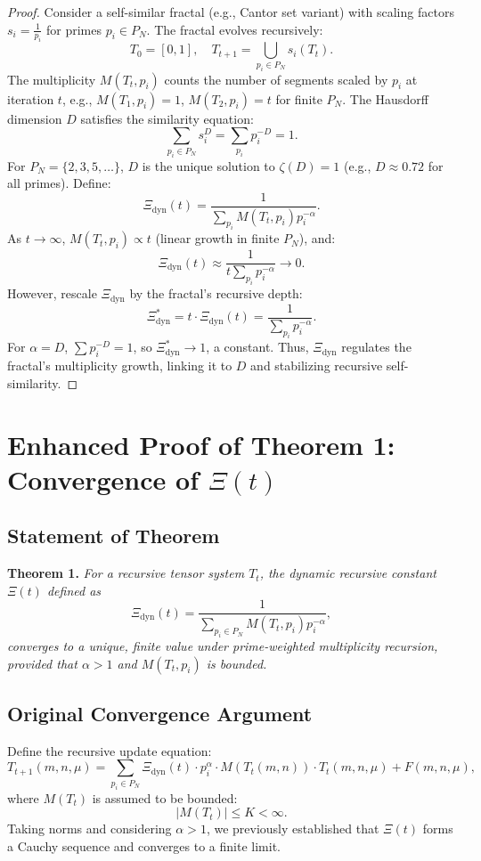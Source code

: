 \documentclass{article}
\theoremstyle{plain}
\begin{document}
\begin{itemize}
\begin{proof}
Consider a self-similar fractal (e.g., Cantor set variant) with scaling factors \( s_i = \frac{1}{p_i} \) for primes \( p_i \in P_N \). The fractal evolves recursively:
\[
T_0 = [0, 1], \quad T_{t+1} = \bigcup_{p_i \in P_N} s_i(T_t).
\]
The multiplicity \( M(T_t, p_i) \) counts the number of segments scaled by \( p_i \) at iteration \( t \), e.g., \( M(T_1, p_i) = 1 \), \( M(T_2, p_i) = t \) for finite \( P_N \). The Hausdorff dimension \( D \) satisfies the similarity equation:
\[
\sum_{p_i \in P_N} s_i^D = \sum_{p_i} p_i^{-D} = 1.
\]
For \( P_N = \{2, 3, 5, \ldots\} \), \( D \) is the unique solution to \(\zeta(D) = 1\) (e.g., \( D \approx 0.72 \) for all primes). Define:
\[
\Xi_{\text{dyn}}(t) = \frac{1}{\sum_{p_i} M(T_t, p_i) p_i^{-\alpha}}.
\]
As \( t \to \infty \), \( M(T_t, p_i) \propto t \) (linear growth in finite \( P_N \)), and:
\[
\Xi_{\text{dyn}}(t) \approx \frac{1}{t \sum_{p_i} p_i^{-\alpha}} \to 0.
\]
However, rescale $\Xi_{\text{dyn}}$ by the fractal’s recursive depth:
\[
\Xi_{\text{dyn}}^* = t \cdot \Xi_{\text{dyn}}(t) = \frac{1}{\sum_{p_i} p_i^{-\alpha}}.
\]
For \(\alpha = D\), \(\sum p_i^{-D} = 1\), so $\Xi_{\text{dyn}}^* \to 1$, a constant. Thus, $\Xi_{\text{dyn}}$ regulates the fractal’s multiplicity growth, linking it to \( D \) and stabilizing recursive self-similarity.
\end{proof}
\section{Enhanced Proof of Theorem 1: Convergence of \(\Xi(t) \)}

\subsection{Statement of Theorem}
\textbf{Theorem 1.} \textit{For a recursive tensor system \( T_t \), the dynamic recursive constant \(\Xi(t) \) defined as}
\begin{equation}
    \Xi_{\text{dyn}}(t) = \frac{1}{\sum_{p_i \in P_N} M(T_t, p_i) p_i^{-\alpha}},
\end{equation}
\textit{converges to a unique, finite value under prime-weighted multiplicity recursion, provided that \( \alpha > 1 \) and \( M(T_t, p_i) \) is bounded.}

\subsection{Original Convergence Argument}
Define the recursive update equation:
\begin{equation}
    T_{t+1}(m,n,\mu) = \sum_{p_i \in P_N} \Xi_{\text{dyn}}(t) \cdot p_i^\alpha \cdot M(T_t(m,n)) \cdot T_t(m,n,\mu) + F(m,n,\mu),
\end{equation}
where \( M(T_t) \) is assumed to be bounded:
\begin{equation}
    |M(T_t)| \leq K < \infty.
\end{equation}
Taking norms and considering \( \alpha > 1 \), we previously established that \(\Xi(t) \) forms a Cauchy sequence and converges to a finite limit.


\end{itemize}
\end{document}
